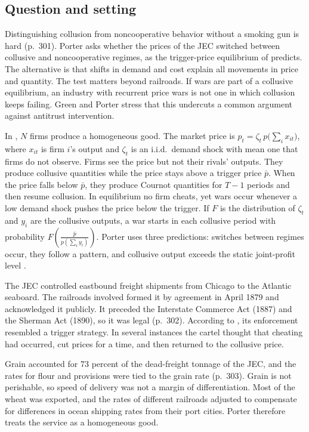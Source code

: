 \subsection{Question and setting}\label{sec:13-jec-setting}

Distinguishing collusion from noncooperative behavior without a smoking gun is hard (p.~301). Porter asks whether
the prices of the JEC switched between collusive and noncooperative regimes, as the trigger-price equilibrium of
\citet{GreenPorter1984} predicts. The alternative is that shifts in demand and cost explain all movements in price
and quantity. The test matters beyond railroads. If wars are part of a collusive equilibrium, an industry with
recurrent price wars is not one in which collusion keeps failing. Green and Porter stress that this undercuts a
common argument against antitrust intervention.

In \citet{GreenPorter1984}, $N$ firms produce a homogeneous good. The market price is
$p_t = \zeta_t\, p\big(\sum_i x_{it}\big)$, where $x_{it}$ is firm $i$'s output and $\zeta_t$ is an i.i.d.\
demand shock with mean one that firms do not observe. Firms see the price but not their rivals' outputs. They produce
collusive quantities while the price stays above a trigger price $\bar p$. When the price falls below $\bar p$, they
produce Cournot quantities for $T - 1$ periods and then resume collusion. In equilibrium no firm cheats, yet wars
occur whenever a low demand shock pushes the price below the trigger. If $F$ is the distribution of $\zeta_t$ and
$y_i$ are the collusive outputs, a war starts in each collusive period with probability
$F(\frac{\bar p}{p(\sum_i y_i)})$. Porter uses three predictions: switches between regimes occur, they follow a pattern, and
collusive output exceeds the static joint-profit level \citep{Porter1983b}.

The JEC controlled eastbound freight shipments from Chicago to the Atlantic seaboard. The railroads involved formed
it by agreement in April 1879 and acknowledged it publicly. It preceded the Interstate Commerce Act (1887) and the
Sherman Act (1890), so it was legal (p.~302). According to \citet{Ulen1979}, its enforcement resembled a trigger
strategy. In several instances the cartel thought that cheating had occurred, cut prices for a time, and then
returned to the collusive price.

Grain accounted for 73 percent of the dead-freight tonnage of the JEC, and the rates for flour and provisions were
tied to the grain rate (p.~303). Grain is not perishable, so speed of delivery was not a margin of
differentiation. Most of the wheat was exported, and the rates of different railroads adjusted to compensate for
differences in ocean shipping rates from their port cities. Porter therefore treats the service as a homogeneous
good.

